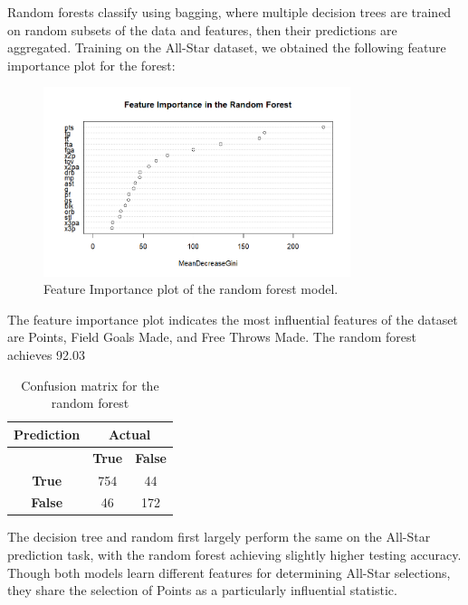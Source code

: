 \documentclass[12pt]{article}
\begin{document}
Random forests classify using bagging, where multiple decision trees are trained on random subsets of the data and features, then their predictions are aggregated. Training on the All-Star dataset, we obtained the following feature importance plot for the forest:

\begin{figure}[H]
    \centering
    \includegraphics[width=0.8\textwidth]{MM_AS_TREE_IP.png}
    \caption{Feature Importance plot of the random forest model.}
    \label{fig:neural_network_architecture}
\end{figure}

The feature importance plot indicates the most influential features of the dataset are Points, Field Goals Made, and Free Throws Made. The random forest achieves 92.03%

\begin{table}[h]
    \centering
    \begin{tabular}{c|cc}
        \toprule
        \textbf{Prediction} & \multicolumn{2}{c}{\textbf{Actual}} \\
        \midrule
        & \textbf{True} & \textbf{False} \\
        \hline
        \textbf{True}  & 754  & 44  \\
        \textbf{False} & 46   & 172 \\
        \bottomrule
    \end{tabular}
    \caption{Confusion matrix for the random forest}
    \label{tab:decision_tree_confusion_matrix}
\end{table}

The decision tree and random first largely perform the same on the All-Star prediction task, with the random forest achieving slightly higher testing accuracy. Though both models learn different features for determining All-Star selections, they share the selection of Points as a particularly influential statistic.
\end{document}
